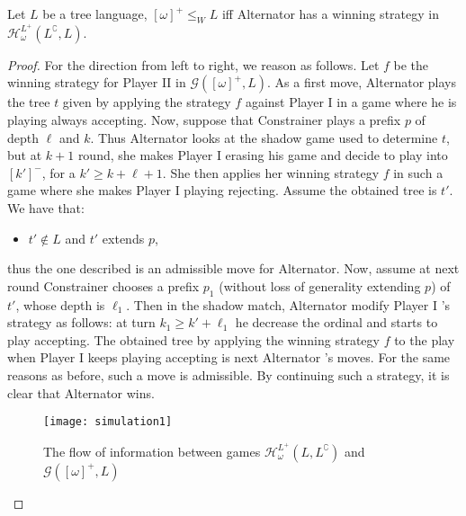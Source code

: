 \begin{proposition}\label{prop:omega} Let $L$ be a tree language, $[\omega]^+ \leq_W L$ iff Alternator has a winning strategy in $\mathcal{H}^{L^+}_\omega(L^\complement, L)$. 

\end{proposition}
\begin{proof}
For the direction from left to right, we reason as follows. Let $f$ be the winning strategy for Player II in $\mathcal{G}([\omega]^+, L)$. As a first move, Alternator plays the tree $t$ given by applying the strategy $f$ against Player I in a game where he is playing always accepting. Now, suppose that Constrainer plays a prefix $p$ of depth $\ell$ and $k$. Thus Alternator looks at the shadow game used to determine $t$, but at $k+1$ round, she makes Player I erasing his game and decide to play into $[k']^-$, for a $k' \geq k + \ell +1$. She then  applies her winning strategy $f$ in such a game where she makes Player I  playing rejecting. Assume the obtained tree is $t'$. We have that:
\begin{itemize}
\item $t' \notin L$ and $t'$ extends $p$,
\end{itemize}
thus the one described is an admissible move for Alternator.
Now, assume at next round Constrainer chooses a prefix $p_1$ (without loss of generality extending $p$) of $t'$, whose depth is $\ell_1$. Then in the shadow match, Alternator modify Player I 's strategy as follows: at turn $k_1 \geq k' + \ell_1$ he decrease the ordinal and starts to play accepting. The obtained tree by applying the winning strategy $f$ to the play when  Player  I keeps playing accepting is next Alternator 's moves. For the same reasons as before, such a move is admissible. By continuing such a strategy, it is clear that Alternator wins.

\begin{figure}
\label{fig1}
\begin{center}
\texttt{[image: simulation1]}
\caption{The flow of information between games $\mathcal{H}^{L^+}_\omega(L, L^\complement)$ and $\mathcal{G}([\omega]^+, L)$}
\end{center}
\end{figure}



\end{proof}
